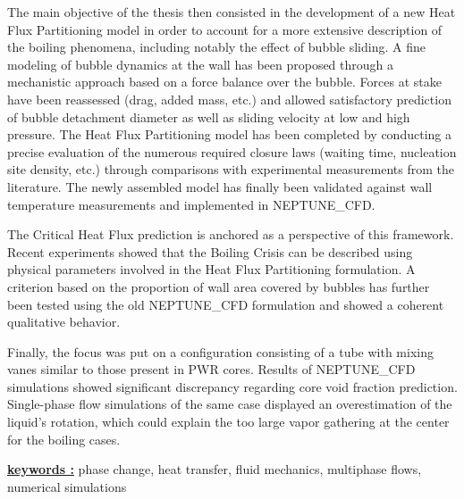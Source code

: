 \npar

The main objective of the thesis then consisted in the development of a new Heat Flux Partitioning model in order to account for a more extensive description of the boiling phenomena, including notably the effect of bubble sliding. A fine modeling of bubble dynamics at the wall has been proposed through a mechanistic approach based on a force balance over the bubble. Forces at stake have been reassessed (drag, added mass, etc.) and allowed satisfactory prediction of bubble detachment diameter as well as sliding velocity at low and high pressure. The Heat Flux Partitioning model has been completed by conducting a precise evaluation of the numerous required closure laws (waiting time, nucleation site density, etc.) through comparisons with experimental measurements from the literature. The newly assembled model has finally been validated against wall temperature measurements and implemented in NEPTUNE\_CFD.

\npar

The Critical Heat Flux prediction is anchored as a perspective of this framework. Recent experiments showed that the Boiling Crisis can be described using physical parameters involved in the Heat Flux Partitioning formulation. A criterion based on the proportion of wall area covered by bubbles has further been tested using the old NEPTUNE\_CFD formulation and showed a coherent qualitative behavior.

\npar

Finally, the focus was put on a configuration consisting of a tube with mixing vanes similar to those present in PWR cores. Results of NEPTUNE\_CFD simulations showed significant discrepancy regarding core void fraction prediction. Single-phase flow simulations of the same case displayed an overestimation of the liquid’s rotation, which could explain the too large vapor gathering at the center for the boiling cases. 

\endgroup		

\npar

\npar

\textbf{\underline{keywords :}} phase change, heat transfer, fluid mechanics, multiphase flows, numerical simulations

\vfill